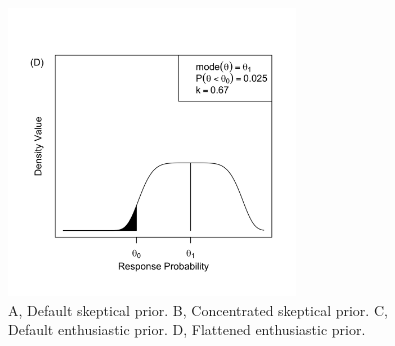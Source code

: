 \documentclass[12pt]{article}
\begin{document}
\begin{figure}[htbp]
\begin{center}
\includegraphics[width=3in]{./figures/figure1d.png}
\caption{A, Default skeptical prior. B, Concentrated skeptical prior. C, Default enthusiastic prior. D, Flattened enthusiastic prior.}

\label{fig:figure1}
\end{center}
\end{figure}
\newpage
\end{document}
